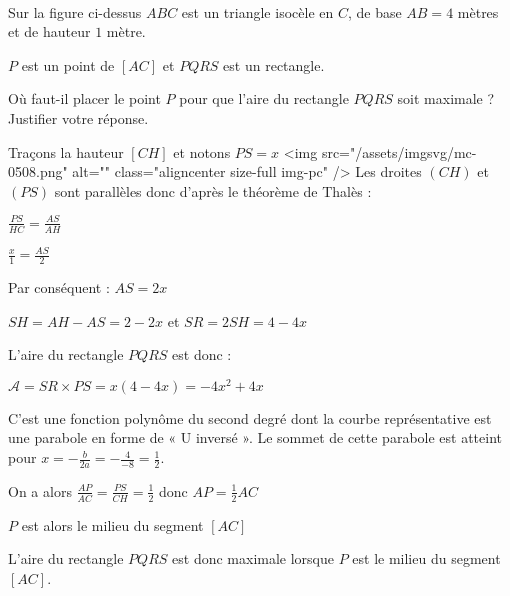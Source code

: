 
%
\\ 
 \begin{center}
      \end{center}
Sur la figure ci-dessus $ABC$ est un triangle isocèle en $C$, de base $AB= 4$ mètres et de hauteur $1$ mètre.
\par
$P$ est un point de $\left[AC\right]$ et $PQRS$ est un rectangle.
\par
Où faut-il placer le point $P$ pour que l'aire du rectangle $PQRS$ soit maximale ? Justifier votre réponse.
\begin{corrige}
     Traçons la hauteur $\left[CH\right]$ et notons $PS=x$
     <img src="/assets/imgsvg/mc-0508.png" alt="" class="aligncenter size-full  img-pc" />
     Les droites $\left(CH\right)$ et $\left(PS\right)$ sont parallèles donc d'après le théorème de Thalès :
     \par
     $\frac{PS}{HC}=\frac{AS}{AH}$
     \par
     $\frac{x}{1}=\frac{AS}{2}$
     \par
     Par conséquent : $AS=2x$
     \par
     $SH=AH-AS=2-2x$ et $SR=2SH=4-4x$
     \par
     L'aire du rectangle $PQRS$ est donc :
     \par
     $\mathscr A=SR\times PS=x\left(4-4x\right)=-4x^{2}+4x$
     \par
     C'est une fonction polynôme du second degré dont la courbe représentative est une parabole en forme de « U inversé ». Le sommet de cette parabole est atteint pour $x=-\frac{b}{2a}=-\frac{4}{-8}=\frac{1}{2}$.
     \par
     On a alors $\frac{AP}{AC}=\frac{PS}{CH}=\frac{1}{2}$ donc $AP=\frac{1}{2}AC$
     \par
     $P$ est alors le milieu du segment $\left[AC\right]$
     \par
     L'aire du rectangle $PQRS$ est donc maximale lorsque $P$ est le milieu du segment $\left[AC\right]$.
\end{corrige}


